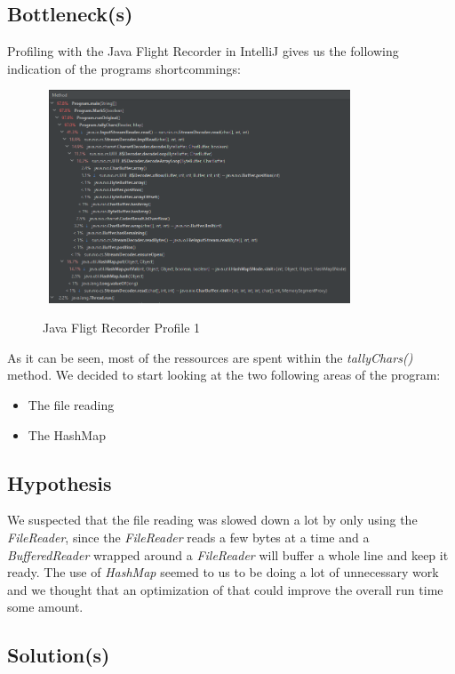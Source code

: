\newpage
\subsection{Bottleneck(s)}
\label{sec:2.3}
Profiling with the Java Flight Recorder in IntelliJ gives us the following indication of the programs shortcommings:
\begin{figure}[H]
    \centering\
    \includegraphics[width = 0.8\textwidth ]{figures/profile1.PNG}
    \caption{Java Fligt Recorder Profile 1}
    \label{fig:p1}
\end{figure}
As it can be seen, most of the ressources are spent within the \emph{tallyChars()} method. We decided to start looking at the two following areas of the program:
\begin{itemize}
    \item The file reading
    \item The HashMap 
\end{itemize}

\vspace{0.5cm}
\subsection{Hypothesis}
\label{sec:2.4}
We suspected that the file reading was slowed down a lot by only using the \emph{FileReader}, since the \emph{FileReader} reads a few bytes at a time and a \emph{BufferedReader} wrapped around a \emph{FileReader} will buffer a whole line and keep it ready. 
The use of \emph{HashMap} seemed to us to be doing a lot of unnecessary work and we thought that an optimization of that could improve the overall run time some amount.  

\vspace{0.5cm}
\subsection{Solution(s)}
\label{sec:2.5}

